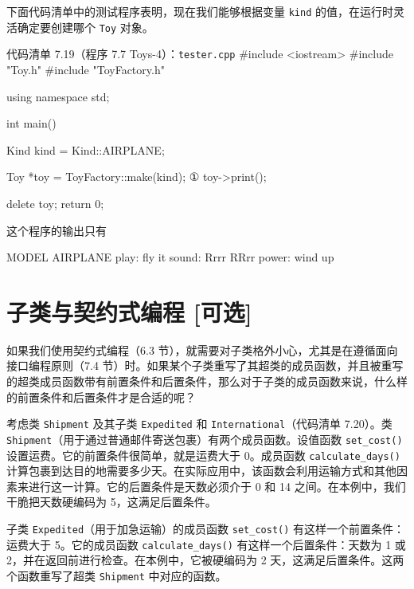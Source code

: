 下面代码清单中的测试程序表明，现在我们能够根据变量 \texttt{kind} 的值，在运行时灵活确定要创建哪个 \texttt{Toy} 对象。

\begin{codeboxt}{代码清单 7.19（程序 7.7 Toys-4）：\texttt{tester.\allowbreak{}cpp}}
#include <iostream>
#include "Toy.h"
#include "ToyFactory.h"

using namespace std;

int main()
{
    Kind kind = Kind::AIRPLANE;

    Toy *toy = ToyFactory::make(kind);      ①
    toy->print();

    delete toy;
    return 0;
}
\end{codeboxt}
\par

这个程序的输出只有

\begin{codebox}
MODEL AIRPLANE
   play: fly it
  sound: Rrrr RRrr
  power: wind up
\end{codebox}


\section{子类与契约式编程 [可选]}

如果我们使用契约式编程（6.3 节），就需要对子类格外小心，尤其是在遵循面向接口编程原则（7.4 节）时。如果某个子类重写了其超类的成员函数，并且被重写的超类成员函数带有前置条件和后置条件，那么对于子类的成员函数来说，什么样的前置条件和后置条件才是合适的呢？

考虑类 \texttt{Shipment} 及其子类 \texttt{Expedited} 和 \texttt{International}（代码清单 7.20）。类 \texttt{Shipment}（用于通过普通邮件寄送包裹）有两个成员函数。设值函数 \texttt{set\_\allowbreak{}cost(\allowbreak{})\allowbreak{}} 设置运费。它的前置条件很简单，就是运费大于 0。成员函数 \texttt{calculate\_\allowbreak{}days(\allowbreak{})\allowbreak{}} 计算包裹到达目的地需要多少天。在实际应用中，该函数会利用运输方式和其他因素来进行这一计算。它的后置条件是天数必须介于 0 和 14 之间。在本例中，我们干脆把天数硬编码为 5，这满足后置条件。

子类 \texttt{Expedited}（用于加急运输）的成员函数 \texttt{set\_\allowbreak{}cost(\allowbreak{})\allowbreak{}} 有这样一个前置条件：运费大于 5。它的成员函数 \texttt{calculate\_\allowbreak{}days(\allowbreak{})\allowbreak{}} 有这样一个后置条件：天数为 1 或 2，并在返回前进行检查。在本例中，它被硬编码为 2 天，这满足后置条件。这两个函数重写了超类 \texttt{Shipment} 中对应的函数。

